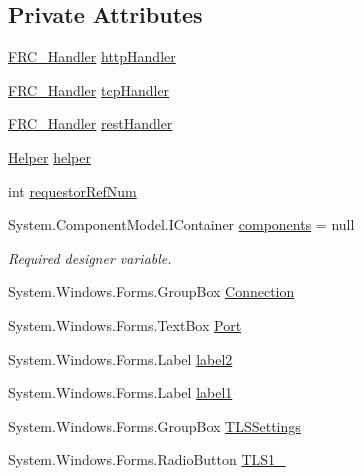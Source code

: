 \subsection*{Private Attributes}
\begin{DoxyCompactItemize}
\item 
\mbox{\hyperlink{interface_form_sim_1_1_f_r_c___handler}{F\+R\+C\+\_\+\+Handler}} \mbox{\hyperlink{class_form_sim_1_1_form1_a8dfc25cc1ba341fc90eedd2c4bc14e0a}{http\+Handler}}
\item 
\mbox{\hyperlink{interface_form_sim_1_1_f_r_c___handler}{F\+R\+C\+\_\+\+Handler}} \mbox{\hyperlink{class_form_sim_1_1_form1_acde1aeecb04378a845d95ff88cf3d040}{tcp\+Handler}}
\item 
\mbox{\hyperlink{interface_form_sim_1_1_f_r_c___handler}{F\+R\+C\+\_\+\+Handler}} \mbox{\hyperlink{class_form_sim_1_1_form1_ac99dc128e2000076182d609b9d5f6c03}{rest\+Handler}}
\item 
\mbox{\hyperlink{class_form_sim_1_1_helper}{Helper}} \mbox{\hyperlink{class_form_sim_1_1_form1_a358dd84324e5c41ae053e22b3de316b1}{helper}}
\item 
int \mbox{\hyperlink{class_form_sim_1_1_form1_a1d6628b9f5ec08a4fa980cd5645b8d29}{requestor\+Ref\+Num}}
\item 
System.\+Component\+Model.\+I\+Container \mbox{\hyperlink{class_form_sim_1_1_form1_a5a556548cf4184594e46a7f09272b157}{components}} = null
\begin{DoxyCompactList}\small\item\em Required designer variable. \end{DoxyCompactList}\item 
System.\+Windows.\+Forms.\+Group\+Box \mbox{\hyperlink{class_form_sim_1_1_form1_a47d1f14e566876f6b65baf0dcc0c654c}{Connection}}
\item 
System.\+Windows.\+Forms.\+Text\+Box \mbox{\hyperlink{class_form_sim_1_1_form1_a76e0d7892cbeb761e8a909ee121bbd28}{Port}}
\item 
System.\+Windows.\+Forms.\+Label \mbox{\hyperlink{class_form_sim_1_1_form1_a0c3a49d36dea620395d3cd1b59297e50}{label2}}
\item 
System.\+Windows.\+Forms.\+Label \mbox{\hyperlink{class_form_sim_1_1_form1_a34a318adef53671e5d6a190cb2059bb9}{label1}}
\item 
System.\+Windows.\+Forms.\+Group\+Box \mbox{\hyperlink{class_form_sim_1_1_form1_ae64d6539b6939fe353891f885c241d28}{T\+L\+S\+Settings}}
\item 
System.\+Windows.\+Forms.\+Radio\+Button \mbox{\hyperlink{class_form_sim_1_1_form1_a7a6e222c261c32e59d5b3fe4240d0a20}{T\+L\+S1\+\_}}

\end{DoxyCompactItemize}
